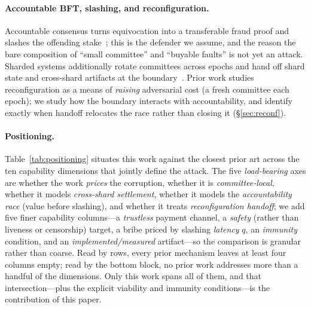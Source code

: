 \paragraph{Accountable BFT, slashing, and reconfiguration.}
Accountable consensus turns equivocation into a transferable fraud proof and slashes the offending
stake~\cite{buterin2017casper,buchman2018tendermint}; this is the defender we assume, and the reason
the bare composition of ``small committee'' and ``buyable faults'' is not yet an attack. Sharded
systems additionally rotate committees across epochs and hand off shard state and cross-shard
artifacts at the boundary~\cite{zamani2018rapidchain,kokoris2018omniledger}. Prior work studies
reconfiguration as a means of \emph{raising} adversarial cost (a fresh committee each epoch); we
study how the boundary interacts with accountability, and identify exactly when handoff relocates the
race rather than closing it (\S\ref{sec:reconf}).

\paragraph{Positioning.}
Table~\ref{tab:positioning} situates this work against the closest prior art across the ten
capability dimensions that jointly define the attack. The five \emph{load-bearing} axes are
whether the work \emph{prices} the corruption, whether it is \emph{committee-local}, whether it
models \emph{cross-shard settlement}, whether it models the \emph{accountability race} (value
before slashing), and whether it treats \emph{reconfiguration handoff}; we add five finer
capability columns---a \emph{trustless} payment channel, a \emph{safety} (rather than liveness or
censorship) target, a bribe priced by slashing \emph{latency} $q$, an \emph{immunity} condition,
and an \emph{implemented/measured} artifact---so the comparison is granular rather than coarse.
Read by rows, every prior mechanism leaves at least four columns empty; read by the bottom block,
no prior work addresses more than a handful of the dimensions. Only this work spans all of them,
and that intersection---plus the explicit viability and immunity conditions---is the contribution
of this paper.

